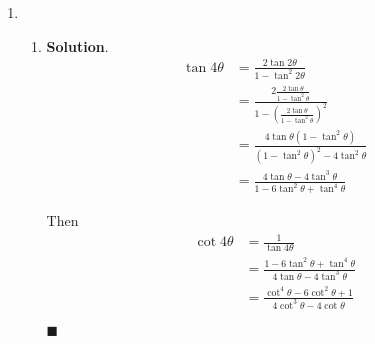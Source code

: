 \documentclass[12pt]{article}
\newenvironment*{sol}{\par \textbf{Solution}.}{\hfill$\blacksquare$}
\begin{document}
\begin{enumerate}
\begin{enumerate}
\begin{enumerate}
\begin{sol}
                    Hence the conclusion is $f$ attains minimum at $\theta=\tan^{-1}(\frac{-4\pm\sqrt{7}}{3})$.
                \end{sol}
            \end{enumerate}
        \end{enumerate}
        \item \begin{enumerate}
            \item \begin{sol}
                \begin{align*}
                    \tan{4\theta}&=\frac{2\tan{2\theta}}{1-\tan^2{2\theta}}\\
                    &=\frac{2\frac{2\tan{\theta}}{1-\tan^2{\theta}}}{1-(\frac{2\tan{\theta}}{1-\tan^2{\theta}})^2}\\
                    &=\frac{4\tan{\theta}(1-\tan^2{\theta})}{(1-\tan^2{\theta})^2-4\tan^2{\theta}}\\
                    &=\frac{4\tan{\theta}-4\tan^3{\theta}}{1-6\tan^2{\theta}+\tan^4{\theta}}
                \end{align*}

                Then \begin{align*}
                    \cot{4\theta}&=\frac{1}{\tan{4\theta}}\\
                    &=\frac{1-6\tan^2{\theta}+\tan^4{\theta}}{4\tan{\theta}-4\tan^3{\theta}}\\
                    &=\frac{\cot^4{\theta}-6\cot^2{\theta}+1}{4\cot^3{\theta}-4\cot{\theta}}
                \end{align*}


\end{sol}
\end{enumerate}
\end{enumerate}
\end{document}
